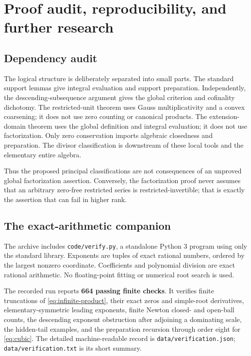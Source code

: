\documentclass[11pt,letterpaper]{article}
\numberwithin{equation}{section}
\theoremstyle{definition}
\theoremstyle{remark}
\newcommand{\code}[1]{\texttt{#1}}
\begin{document}
\section{Proof audit, reproducibility, and further research}\label{sec:audit}

\subsection{Dependency audit}
The logical structure is deliberately separated into small parts.
The standard support lemmas give integral evaluation and support preparation.
Independently, the descending-subsequence argument gives the global criterion
and cofinality dichotomy. The restricted-unit theorem uses Gauss
multiplicativity and a convex coarsening; it does not use zero counting or
canonical products. The extension-domain theorem uses the global definition
and integral evaluation; it does not use factorization. Only zero
conservation imports algebraic closedness and preparation. The divisor
classification is downstream of these local tools and the elementary entire
algebra.

Thus the proposed principal classifications are not consequences of an
unproved global factorization assertion. Conversely, the factorization proof
never assumes that an arbitrary zero-free restricted series is restricted-invertible;
that is exactly the assertion that can fail in higher rank.

\subsection{The exact-arithmetic companion}
The archive includes \code{code/verify.py}, a standalone Python 3 program
using only the standard library. Exponents are tuples of exact rational
numbers, ordered by the largest nonzero coordinate. Coefficients and
polynomial division are exact rational arithmetic. No floating-point fitting
or numerical root search is used.

The recorded run reports \textbf{664 passing finite checks}. It verifies
finite truncations of \eqref{eq:infinite-product}, their exact zeros and
simple-root derivatives, elementary-symmetric leading exponents, finite
Newton closed- and open-ball counts, the descending exponent obstruction
after adjoining a dominating scale, the hidden-tail examples, and the
preparation recursion through order eight for \eqref{eq:cubic}.
The detailed machine-readable record is \code{data/verification.json};
\code{data/verification.txt} is its short summary.
\end{document}
